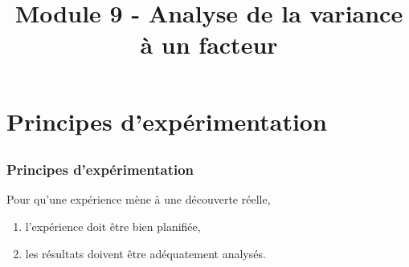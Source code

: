 \documentclass{BeamerTemplate}
\title{Module 9 - Analyse de la variance à un facteur}
\begin{document}
\begin{frame}[t]
  \titlepage
\end{frame}



    



\section[Principes]{Principes d'expérimentation}
\subsection*{ }


\begin{frame}[t]
 \frametitle{Principes d'expérimentation}

 {\small
 Pour qu'une expérience mène à une découverte réelle,
 \begin{enumerate}\itemsep0mm
 \item  l'expérience doit  être bien planifiée,
 \item les résultats doivent être adéquatement analysés.
\end{enumerate}

\medskip
{}
}
\end{frame}
\end{document}
